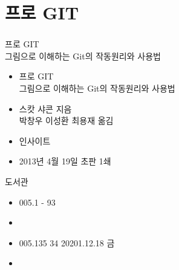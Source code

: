 \documentclass[aspectratio=1610,17pt,xcolor=pdftex,dvipsnames,table,handout]{beamer}
\begin{document}
		\section{프로 GIT}
		\begin{frame} [t,plain]
		\frametitle{}
			\begin{block}  {프로 GIT 	\\	그림으로 이해하는 Git의 작동원리와 사용법 }
			\setlength{\leftmargini}{4em}			
			\begin{itemize} 
				\item [제목]  	프로 GIT \\	그림으로 이해하는 Git의 작동원리와 사용법 
				\item [지은이]	스캇 샤콘 지음 \\ 박창우 이성환 최용재 옮김
				\item [출판사]	인사이트
				\item [출판일]	2013년 4월 19일  초판 1쇄 
			\end{itemize}
			\end{block}						

			\begin{block}  {도서관}
			\setlength{\leftmargini}{4em}			
			\begin{itemize}
				\item [중앙]		005.1 - 93
				\item [수정]		
				\item [부전]		005.135 34	20201.12.18 금
				\item [도서관]
			\end{itemize}
			\end{block}						
								
		\end{frame}						

\end{document}
